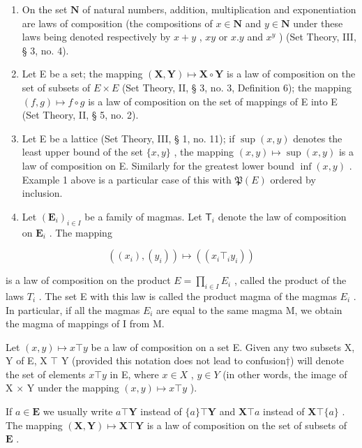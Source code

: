 \begin{enumerate}
\def\labelenumi{(\arabic{enumi})}
\setcounter{enumi}{1}
\item
  On the set \(\mathbf{N}\) of natural numbers, addition, multiplication and exponentiation are laws of composition (the compositions of \(x \in \mathbf{N}\) and \(y \in \mathbf{N}\) under these laws being denoted respectively by \(x + y\) , \(xy\) or \(x.y\) and \(x^y\) ) (Set Theory, III, § 3, no. 4).
\item
  Let E be a set; the mapping \((\mathbf{X}, \mathbf{Y}) \mapsto \mathbf{X} \circ \mathbf{Y}\) is a law of composition on the set of subsets of \(E \times E\) (Set Theory, II, § 3, no. 3, Definition 6); the mapping \((f, g) \mapsto f \circ g\) is a law of composition on the set of mappings of E into E (Set Theory, II, § 5, no. 2).
\item
  Let E be a lattice (Set Theory, III, § 1, no. 11); if \(\sup(x, y)\) denotes the least upper bound of the set \(\{x, y\}\) , the mapping \((x, y) \mapsto \sup(x, y)\) is a law of composition on E. Similarly for the greatest lower bound \(\inf(x, y)\) . Example 1 above is a particular case of this with \(\mathfrak{P}(E)\) ordered by inclusion.
\item
  Let \((\mathbf{E}_i)_{i\in I}\) be a family of magmas. Let \(\mathsf{T}_i\) denote the law of composition on \(\mathbf{E}_i\) . The mapping
\end{enumerate}

\[
((x _ {i}), (y _ {i})) \mapsto ((x _ {i} \top_ {i} y _ {i}))
\]

is a law of composition on the product \(E = \prod_{i \in I} E_i\) , called the product of the laws \(T_i\) . The set E with this law is called the product magma of the magmas \(E_i\) . In particular, if all the magmas \(E_i\) are equal to the same magma M, we obtain the magma of mappings of I from M.

Let \((x,y)\mapsto x\top y\) be a law of composition on a set E. Given any two subsets X, Y of E, X \(\top\) Y (provided this notation does not lead to confusion†) will denote the set of elements \(x\top y\) in E, where \(x\in X\) , \(y\in Y\) (in other words, the image of X \(\times\) Y under the mapping \((x,y)\mapsto x\top y\) ).

If \(a \in \mathbf{E}\) we usually write \(a \top \mathbf{Y}\) instead of \(\{a\} \top \mathbf{Y}\) and \(\mathbf{X} \top a\) instead of \(\mathbf{X} \top \{a\}\) . The mapping \((\mathbf{X}, \mathbf{Y}) \mapsto \mathbf{X} \top \mathbf{Y}\) is a law of composition on the set of subsets of \(\mathbf{E}\) .

